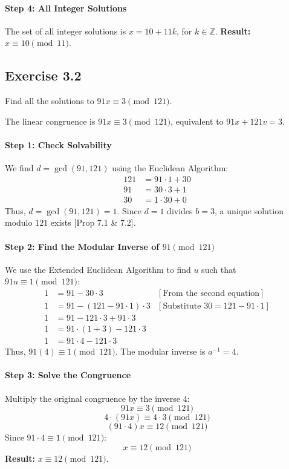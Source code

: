 \begin{solution}
\paragraph{Step 4: All Integer Solutions}
The set of all integer solutions is $x = 10 + 11k$, for $k \in \mathbb{Z}$.
\textbf{Result:} $x \equiv 10 \pmod{11}$.
\end{solution}

\subsection*{Exercise 3.2}
Find all the solutions to $91x \equiv 3 \pmod{121}$.

\begin{solution}
The linear congruence is $91x \equiv 3 \pmod{121}$, equivalent to $91x + 121v = 3$.

\paragraph{Step 1: Check Solvability}
We find $d = \gcd(91, 121)$ using the Euclidean Algorithm:
\begin{align*}
    121 &= 91 \cdot 1 + 30 \\
    91 &= 30 \cdot 3 + 1 \\
    30 &= 1 \cdot 30 + 0
\end{align*}
Thus, $d = \gcd(91, 121) = 1$.
Since $d=1$ divides $b=3$, a unique solution modulo $121$ exists [Prop 7.1 \& 7.2].

\paragraph{Step 2: Find the Modular Inverse of $91 \pmod{121}$}
We use the Extended Euclidean Algorithm to find $u$ such that $91u \equiv 1 \pmod{121}$:
\begin{align*}
    1 &= 91 - 30 \cdot 3 & [\text{From the second equation}] \\
    1 &= 91 - (121 - 91 \cdot 1) \cdot 3 & [\text{Substitute } 30 = 121 - 91 \cdot 1] \\
    1 &= 91 - 121 \cdot 3 + 91 \cdot 3 \\
    1 &= 91 \cdot (1 + 3) - 121 \cdot 3 \\
    1 &= 91 \cdot 4 - 121 \cdot 3
\end{align*}
Thus, $91(4) \equiv 1 \pmod{121}$. The modular inverse is $a^{-1} = 4$.

\paragraph{Step 3: Solve the Congruence}
Multiply the original congruence by the inverse $4$:
$$ 91x \equiv 3 \pmod{121} $$
$$ 4 \cdot (91x) \equiv 4 \cdot 3 \pmod{121} $$
$$ (91 \cdot 4) x \equiv 12 \pmod{121} $$
Since $91 \cdot 4 \equiv 1 \pmod{121}$:
$$ x \equiv 12 \pmod{121} $$
\textbf{Result:} $x \equiv 12 \pmod{121}$.
\end{solution}

